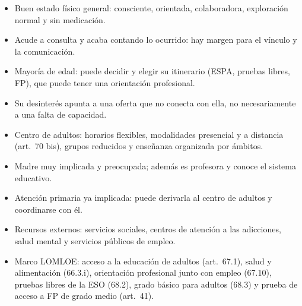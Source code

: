 \documentclass[11pt,a4paper]{article}
\newcommand{\dafobox}[3]{%
  \begin{tcolorbox}[enhanced, colback=#1!5, colframe=#1, boxrule=0.8pt, arc=1pt,
      title=#2, fonttitle=\bfseries, height=9.6cm, valign=top, fontupper=\small]
    #3
  \end{tcolorbox}}
\begin{document}
\noindent
\begin{minipage}[t]{0.49\linewidth}
\dafobox{verde}{Fortalezas (internas)}{%
\begin{itemize}[leftmargin=1em, itemsep=1pt]
  \item Buen estado físico general: consciente, orientada, colaboradora,
  exploración normal y sin medicación.
  \item Acude a consulta y acaba contando lo ocurrido: hay margen para el
  vínculo y la comunicación.
  \item Mayoría de edad: puede decidir y elegir su itinerario (ESPA, pruebas
  libres, FP), que puede tener una orientación profesional.
  \item Su desinterés apunta a una oferta que no conecta con ella, no
  necesariamente a una falta de capacidad.
  \item Centro de adultos: horarios flexibles, modalidades presencial y a
  distancia (art.~70 bis), grupos reducidos y enseñanza organizada por ámbitos.
\end{itemize}}
\end{minipage}\hfill
\begin{minipage}[t]{0.49\linewidth}
\dafobox{azul}{Oportunidades (externas)}{%
\begin{itemize}[leftmargin=1em, itemsep=1pt]
  \item Madre muy implicada y preocupada; además es profesora y conoce el
  sistema educativo.
  \item Atención primaria ya implicada: puede derivarla al centro de adultos
  y coordinarse con él.
  \item Recursos externos: servicios sociales, centros de atención a las
  adicciones, salud mental y servicios públicos de empleo.
  \item Marco LOMLOE: acceso a la educación de adultos (art.~67.1), salud y
  alimentación (66.3.i), orientación profesional junto con empleo (67.10),
  pruebas libres de la ESO (68.2), grado básico para adultos (68.3) y prueba de
  acceso a FP de grado medio (art.~41).
\end{itemize}}
\end{minipage}
\end{document}

